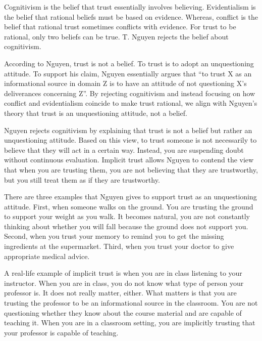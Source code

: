 \documentclass[12pt, a4paper, twoside]{article}
\begin{document}
\maketitle{}

Cognitivism is the belief that trust essentially involves believing. Evidentialism is the belief that rational beliefs must be based on evidence. Whereas, conflict is the belief that rational trust sometimes conflicts with evidence. For trust to be rational, only two beliefs can be true. T. Nguyen rejects the belief about cognitivism.

According to Nguyen, trust is not a belief. To trust is to adopt an unquestioning attitude. To support his claim, Nguyen essentially argues that “to trust X as an informational source in domain Z is to have an attitude of not questioning X’s deliverances concerning Z”. By rejecting cognitivism and instead focusing on how conflict and evidentialism coincide to make trust rational, we align with Nguyen’s theory that trust is an unquestioning attitude, not a belief.

Nguyen rejects cognitivism by explaining that trust is not a belief but rather an unquestioning attitude. Based on this view, to trust someone is not necessarily to believe that they will act in a certain way. Instead, you are suspending doubt without continuous evaluation. Implicit trust allows Nguyen to contend the view that when you are trusting them, you are not believing that they are trustworthy, but you still treat them as if they are trustworthy.

There are three examples that Nguyen gives to support trust as an unquestioning attitude. First, when someone walks on the ground. You are trusting the ground to support your weight as you walk. It becomes natural, you are not constantly thinking about whether you will fall because the ground does not support you. Second, when you trust your memory to remind you to get the missing ingredients at the supermarket. Third, when you trust your doctor to give appropriate medical advice. 

A real-life example of implicit trust is when you are in class listening to your instructor. When you are in class, you do not know what type of person your professor is. It does not really matter, either. What matters is that you are trusting the professor to be an informational source in the classroom. You are not questioning whether they know about the course material and are capable of teaching it. When you are in a classroom setting, you are implicitly trusting that your professor is capable of teaching.
\end{document}
